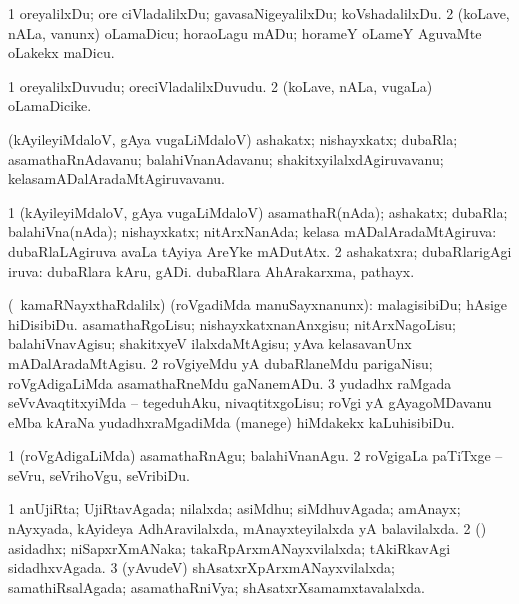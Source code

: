 \bentry
{}
\gl{\sakirx}
\bmng
\bnum
\num{1} oreyalilxDu; ore ciVladalilxDu; gavasaNigeyalilxDu; koVshadalilxDu. 
\num{2} (koLave, nALa, \mo vanunx) oLamaDicu; horaoLagu mADu; horameY oLameY AguvaMte oLakekx maDicu. 
\enum
\emng
\eentry

\bentry
{}
\gl{\nA}
\bmng
\bnum
\num{1} oreyalilxDuvudu; oreciVladalilxDuvudu. 
\num{2} (koLave, nALa, \mo vugaLa) oLamaDicike. 
\enum
\emng
\eentry

\bentry
{}
\gl{\nA}
\bmng
(kAyileyiMdaloV, gAya \mo vugaLiMdaloV) ashakatx; nishayxkatx; dubaRla; asamathaRnAdavanu; balahiVnanAdavanu; shakitxyilalxdAgiruvavanu; kelasamADalAradaMtAgiruvavanu. 
\emng
\eentry

\bentry
{}
\gl{\gu}
\bmng
\bnum
\num{1} (kAyileyiMdaloV, gAya \mo vugaLiMdaloV) asamathaR(nAda); ashakatx; dubaRla; balahiVna(nAda); nishayxkatx; nitArxNanAda; kelasa mADalAradaMtAgiruva:  dubaRlaLAgiruva avaLa tAyiya AreYke mADutAtx. 
\num{2} ashakatxra; dubaRlarigAgi iruva:  dubaRlara kAru, gADi.  dubaRlara AhArakarxma, pathayx. 
\enum
\emng
\eentry

\bentry
{}
\gl{\sakirx}
\bmng
\bnum
{} (\sA\ kamaRNayxthaRdalilx) (roVgadiMda manuSayxnanunx): 
\banum
{} malagisibiDu; hAsige hiDisibiDu. 
 asamathaRgoLisu; nishayxkatxnanAnxgisu; nitArxNagoLisu; balahiVnavAgisu; shakitxyeV ilalxdaMtAgisu; yAva kelasavanUnx mADalAradaMtAgisu. 
\eanum
\numie
\num{2} roVgiyeMdu yA dubaRlaneMdu parigaNisu; roVgAdigaLiMda asamathaRneMdu gaNanemADu. 
\num{3} yudadhx raMgada seVvAvaqtitxyiMda -- tegeduhAku, nivaqtitxgoLisu; roVgi yA gAyagoMDavanu eMba kAraNa yudadhxraMgadiMda (manege) hiMdakekx kaLuhisibiDu. 
\enum
\emng

\noindent
\gl{\akirx}
\bmng
\bnum
\num{1} (roVgAdigaLiMda) asamathaRnAgu; balahiVnanAgu. 
\num{2} roVgigaLa paTiTxge -- seVru, seVrihoVgu, seVribiDu. 
\enum
\emng
\eentry

\bentry
{}
\gl{\gu}
\bmng
\bnum
\num{1} anUjiRta; UjiRtavAgada; nilalxda; asiMdhu; siMdhuvAgada; amAnayx; nAyxyada, kAyideya AdhAravilalxda, mAnayxteyilalxda yA balavilalxda. 
\num{2} (\takaR) asidadhx; niSapxrXmANaka; takaRpArxmANayxvilalxda; tAkiRkavAgi sidadhxvAgada. 
\num{3} (yAvudeV) shAsatxrXpArxmANayxvilalxda; samathiRsalAgada; asamathaRniVya; shAsatxrXsamamxtavalalxda. 
\enum
\emng
\eentry

